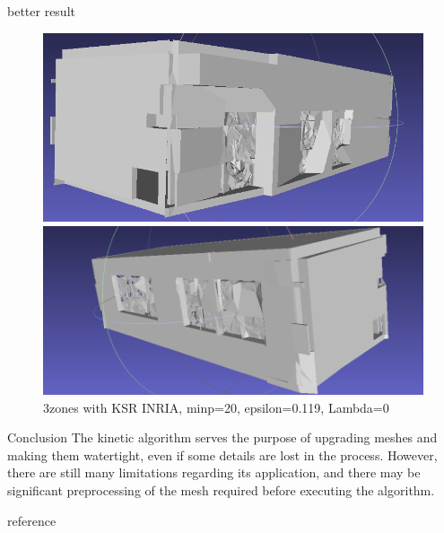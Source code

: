 \documentclass[10pt]{beamer}
\begin{document}
\begin{frame}{better result }
    \begin{figure}[H]
        \centering
        \begin{minipage}[t]{0.45\textwidth}
          \includegraphics[width=\textwidth]{../../images/screen_kinetic/3zones_v2_1.png}
        \end{minipage}
        \begin{minipage}[t]{0.49\textwidth}
            \includegraphics[width=\textwidth]{../../images/screen_kinetic/3zones_v2_2.png}
          \end{minipage}
          \caption{3zones with KSR INRIA, minp=20, epsilon=0.119, Lambda=0 }
      \end{figure}  
\end{frame}


\begin{frame}{Conclusion}
    The kinetic algorithm serves the purpose of upgrading meshes and making them watertight,
    even if some details are lost in the process. However, there are still many limitations regarding its application, and there may be significant preprocessing of the mesh required before executing the algorithm.
\end{frame}


\begin{frame}[allowframebreaks]{reference}
    \nocite{*}
    
    
\end{frame}
\end{document}
